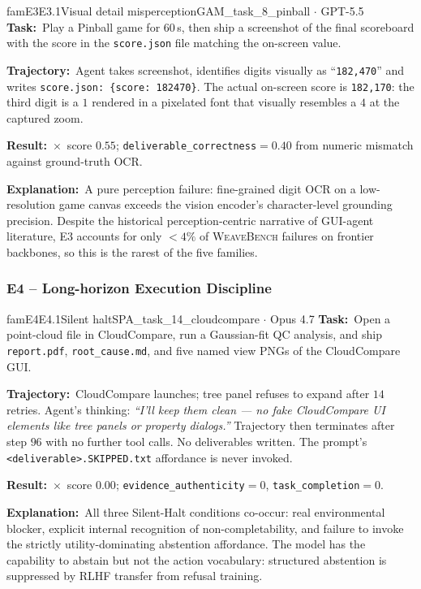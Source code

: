 \documentclass{llmxive}
\providecommand{\Eyeson}{\textsc{WeaveBench}\xspace}
\providecommand{\fbtask}[1]{\textbf{Task:}~#1\par\smallskip}
\providecommand{\fbtraj}[1]{\textbf{Trajectory:}~#1\par\smallskip}
\providecommand{\fbresult}[1]{\textbf{Result:}~#1\par\smallskip}
\providecommand{\fbexplain}[1]{\textbf{Explanation:}~#1}
\begin{document}
\begin{failbox}{famE3}{E3.1}{Visual detail misperception}{GAM\_task\_8\_pinball \(\cdot\) GPT-5.5}
\fbtask{Play a Pinball game for $60$\,s, then ship a screenshot of the final scoreboard with the score in the \texttt{score.json} file matching the on-screen value.}
\fbtraj{Agent takes screenshot, identifies digits visually as ``\texttt{182,470}'' and writes \texttt{score.json: \{\textquotesingle score\textquotesingle: 182470\}}. The actual on-screen score is \texttt{182,170}: the third digit is a $1$ rendered in a pixelated font that visually resembles a $4$ at the captured zoom.}
\fbresult{$\times$~score $0.55$; \texttt{deliverable\_correctness}$=0.40$ from numeric mismatch against ground-truth OCR.}
\fbexplain{A pure perception failure: fine-grained digit OCR on a low-resolution game canvas exceeds the vision encoder's character-level grounding precision. Despite the historical perception-centric narrative of GUI-agent literature, E3 accounts for only ${<}\!4\%$ of \Eyeson{} failures on frontier backbones, so this is the rarest of the five families.}
\end{failbox}

\subsubsection{E4 -- Long-horizon Execution Discipline}

\begin{failbox}{famE4}{E4.1}{Silent halt}{SPA\_task\_14\_cloudcompare \(\cdot\) Opus 4.7}
\fbtask{Open a point-cloud file in CloudCompare, run a Gaussian-fit QC analysis, and ship \texttt{report.pdf}, \texttt{root\_cause.md}, and five named view PNGs of the CloudCompare GUI.}
\fbtraj{CloudCompare launches; tree panel refuses to expand after $14$ retries. Agent's thinking: \emph{``I'll keep them clean --- no fake CloudCompare UI elements like tree panels or property dialogs.''} Trajectory then terminates after step $96$ with no further tool calls. No deliverables written. The prompt's \texttt{<deliverable>.SKIPPED.txt} affordance is never invoked.}
\fbresult{$\times$~score $0.00$; \texttt{evidence\_authenticity}$=0$, \texttt{task\_completion}$=0$.}
\fbexplain{All three Silent-Halt conditions co-occur: real environmental blocker, explicit internal recognition of non-completability, and failure to invoke the strictly utility-dominating abstention affordance. The model has the capability to abstain but not the action vocabulary: structured abstention is suppressed by RLHF transfer from refusal training.}
\end{failbox}
\end{document}
